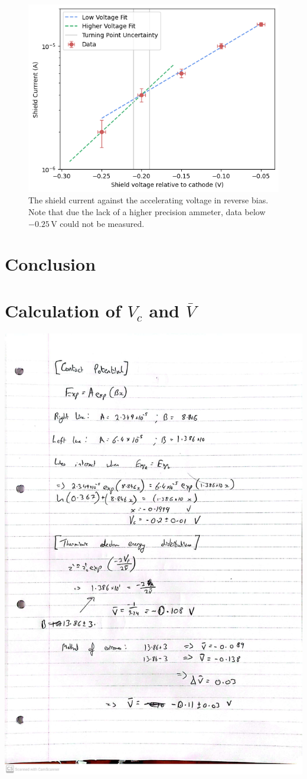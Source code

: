 \documentclass[%
reprint,
amsmath,amssymb,
aps,
floatfix
]{revtex4-2}
\begin{document}
	\begin{figure}
		\includegraphics[width=\columnwidth]{kneeGraph.png}
		\caption{\label{fig:kneeGraph}The shield current against the accelerating voltage in reverse bias. Note that due the lack of a higher precision ammeter, data below $-0.25 \,\text{V}$ could not be measured.}
	\end{figure}
	
	\section{Conclusion}
		
	\clearpage
	
	\clearpage
	\onecolumngrid
	\appendix
	
	\section{Calculation of $V_c$ and $\bar{V}$}
	\includegraphics[width=0.9\columnwidth]{discrepancies.jpg}

	
	
\end{document}
